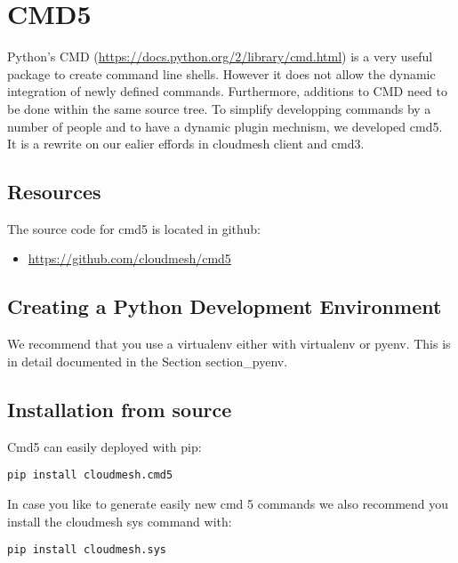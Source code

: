 \FILENAME

\section{CMD5}\label{cmd5}

Python's CMD (\url{https://docs.python.org/2/library/cmd.html}) is a
very useful package to create command line shells. However it does not
allow the dynamic integration of newly defined commands. Furthermore,
additions to CMD need to be done within the same source tree. To
simplify developping commands by a number of people and to have a
dynamic plugin mechnism, we developed cmd5. It is a rewrite on our
ealier effords in cloudmesh client and cmd3.

\subsection{Resources}\label{resources}

The source code for cmd5 is located in github:

\begin{itemize}

\item
  \url{https://github.com/cloudmesh/cmd5}
\end{itemize}

\subsection{Creating a Python Development
Environment}\label{creating-a-python-development-environment}

We recommend that you use a virtualenv either with virtualenv or pyenv.
This is in detail documented in the Section section\_pyenv.

\subsection{Installation from source}\label{installation-from-source}

Cmd5 can easily deployed with pip:

\begin{verbatim}
pip install cloudmesh.cmd5
\end{verbatim}

In case you like to generate easily new cmd 5 commands we also recommend
you install the cloudmesh sys command with:

\begin{verbatim}
pip install cloudmesh.sys
\end{verbatim}

